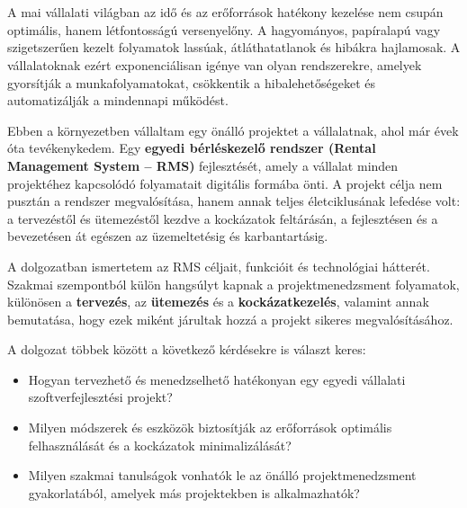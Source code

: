 \chapter{\bevezetes}

A mai vállalati világban az idő és az erőforrások hatékony kezelése nem csupán optimális, hanem létfontosságú versenyelőny. 
A hagyományos, papíralapú vagy szigetszerűen kezelt folyamatok lassúak, átláthatatlanok és hibákra hajlamosak. 
A vállalatoknak ezért exponenciálisan igénye van olyan rendszerekre, amelyek gyorsítják a munkafolyamatokat, csökkentik 
a hibalehetőségeket és automatizálják a mindennapi működést.

Ebben a környezetben vállaltam egy önálló projektet a vállalatnak, ahol már évek óta tevékenykedem.
Egy \textbf{egyedi bérléskezelő rendszer (Rental Management System – RMS)} fejlesztését, 
amely a vállalat minden projektéhez kapcsolódó folyamatait digitális formába önti. 
A projekt célja nem pusztán a rendszer megvalósítása, hanem annak teljes életciklusának lefedése volt: a tervezéstől és ütemezéstől kezdve a kockázatok feltárásán, 
a fejlesztésen és a bevezetésen át egészen az üzemeltetésig és karbantartásig.

A dolgozatban ismertetem az RMS céljait, funkcióit és technológiai hátterét. 
Szakmai szempontból külön hangsúlyt kapnak a projektmenedzsment folyamatok, 
különösen a \textbf{tervezés}, az \textbf{ütemezés} és a \textbf{kockázatkezelés}, valamint annak bemutatása, 
hogy ezek miként járultak hozzá a projekt sikeres megvalósításához.

\vspace{1em}
\noindent A dolgozat többek között a következő kérdésekre is választ keres:
\begin{itemize}
    \item Hogyan tervezhető és menedzselhető hatékonyan egy egyedi vállalati szoftverfejlesztési projekt?
    \item Milyen módszerek és eszközök biztosítják az erőforrások optimális felhasználását és a kockázatok minimalizálását?
    \item Milyen szakmai tanulságok vonhatók le az önálló projektmenedzsment gyakorlatából, amelyek más projektekben is alkalmazhatók?
\end{itemize}